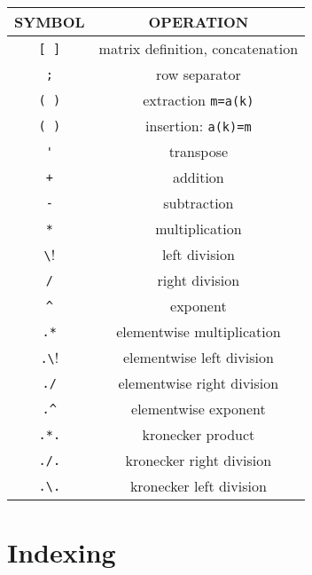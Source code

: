 \begin{center}
\begin{tabular}{|c|c|}
\hline
SYMBOL & OPERATION 
\\ \hline \hline
\verb![ ]! & matrix definition, concatenation\\ \hline

\verb!;! & row separator\\ \hline

\verb!( )! & extraction \verb!m=a(k)! \\ \hline

\verb!( )! & insertion:  \verb!a(k)=m!  \\ \hline

\verb!'! & transpose \\ \hline

\verb!+! & addition  \\ \hline

\verb!-! & subtraction \\ \hline

\verb!*! & multiplication \\ \hline

\verb!\! & left division \\ \hline

\verb!/! & right division \\ \hline

\verb!^! &  exponent \\ \hline

\verb!.*! & elementwise multiplication  \\ \hline

\verb!.\! &  elementwise left division  \\ \hline

\verb!./! &  elementwise right division  \\ \hline

\verb!.^! &  elementwise exponent  \\ \hline

\verb!.*.! & kronecker product \\ \hline

\verb!./.! & kronecker right division \\ \hline

\verb!.\.! &  kronecker left division \\ \hline  
\end{tabular}
\end{center}

\section{Indexing}

